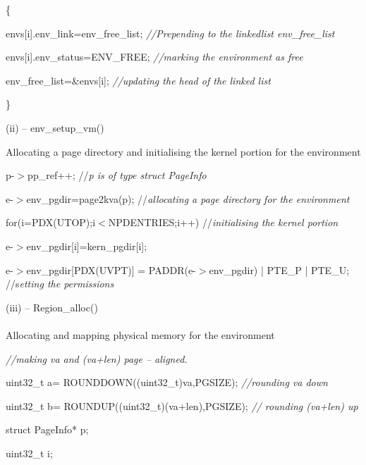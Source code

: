 \documentclass[a4paper,portrait,12pt]{article}
\begin{document}
\{


	envs[i].env\_link=env\_free\_list;   \emph{//Prepending to the linkedlist env\_free\_list}


	envs[i].env\_status=ENV\_FREE;   \emph{//marking the environment as free}


	env\_free\_list=\&envs[i];                 \emph{//updating the head of the linked list}


\}








(ii) -- env\_setup\_vm()





Allocating a page directory and initialising the kernel portion for the environment





	p-$>$pp\_ref++;    //\emph{p is of type struct PageInfo}


	


	e-$>$env\_pgdir=page2kva(p);     //\emph{allocating a page directory for the environment}


	


	for(i=PDX(UTOP);i$<$NPDENTRIES;i++)  //\emph{initialising the kernel portion}


		e-$>$env\_pgdir[i]=kern\_pgdir[i];


	e-$>$env\_pgdir[PDX(UVPT)] = PADDR(e-$>$env\_pgdir) | PTE\_P | PTE\_U; \\				//s\emph{etting the permissions}




(iii) -- Region\_alloc()\\\\Allocating and mapping physical memory for the environment

	\emph{//making va and (va+len) page -- aligned.}


	uint32\_t a= ROUNDDOWN((uint32\_t)va,PGSIZE);   \emph{//rounding va down}


	uint32\_t b= ROUNDUP((uint32\_t)(va+len),PGSIZE); \emph{// rounding (va+len) up}


	


	struct PageInfo* p;


	uint32\_t i;


	
\end{document}
